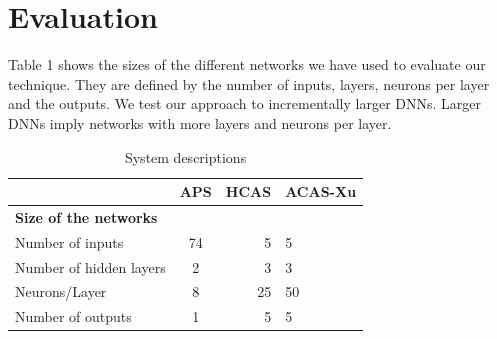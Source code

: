 \chapter{Evaluation}
Table 1 shows the sizes of the different networks we have used to evaluate our technique. They are defined by the number of inputs, layers, neurons per layer and the outputs. We test our approach to incrementally larger DNNs. Larger DNNs imply networks with more layers and neurons per layer. %


\begin{table}[h!]
	\begin{center}
		\caption{System descriptions}
		\label{tab:table1}
		\begin{tabular}{l|S|r|l}
			\textbf{} & \textbf{APS} & \textbf{HCAS} & \textbf{ACAS-Xu} \\
			\hline
			\textbf{Size of the networks} &  &  &  \\
			Number of inputs &  74&   5&  5\\
			Number of hidden layers &  2&  3&  3\\
			Neurons/Layer &  8&  25 & 50 \\
			Number of outputs & 1&  5& 5\\
			\hline
			\hline
			
		\end{tabular}
	\end{center}
\end{table}


